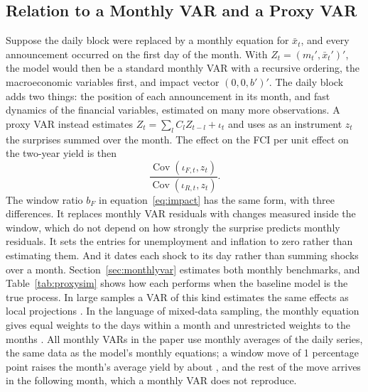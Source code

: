 \documentclass[11pt]{article}
\begin{document}
\begin{appendices}
\section{Relation to a Monthly VAR and a Proxy VAR}\label{app:relation}
Suppose the daily block were replaced by a monthly equation for $\bar x_t$, and every announcement occurred on the first day of the month. With $Z_t=(m_t',\bar x_t')'$, the model would then be a standard monthly VAR with a recursive ordering, the macroeconomic variables first, and impact vector $(0,0,b')'$. The daily block adds two things: the position of each announcement in its month, and fast dynamics of the financial variables, estimated on many more observations. A proxy VAR \citep{gertler2015,mertens2013,stock2018} instead estimates $Z_t=\sum_l C_l Z_{t-l}+\iota_t$ and uses as an instrument $z_t$ the surprises summed over the month. The effect on the FCI per unit effect on the two-year yield is then
\begin{equation}
\frac{\operatorname{Cov}(\iota_{F,t},z_t)}{\operatorname{Cov}(\iota_{R,t},z_t)}. \label{eq:proxy}
\end{equation}
The window ratio $b_F$ in equation~\eqref{eq:impact} has the same form, with three differences. It replaces monthly VAR residuals with changes measured inside the window, which do not depend on how strongly the surprise predicts monthly residuals. It sets the entries for unemployment and inflation to zero rather than estimating them. And it dates each shock to its day rather than summing shocks over a month. Section~\ref{sec:monthlyvar} estimates both monthly benchmarks, and Table~\ref{tab:proxysim} shows how each performs when the baseline model is the true process. In large samples a VAR of this kind estimates the same effects as local projections \citep{plagborg2021}. In the language of mixed-data sampling, the monthly equation gives equal weights to the days within a month and unrestricted weights to the months \citep{ghysels2007,foroni2015}. All monthly VARs in the paper use monthly averages of the daily series, the same data as the model's monthly equations; a window move of 1 percentage point raises the month's average yield by about , and the rest of the move arrives in the following month, which a monthly VAR does not reproduce.


\end{appendices}
\end{document}
